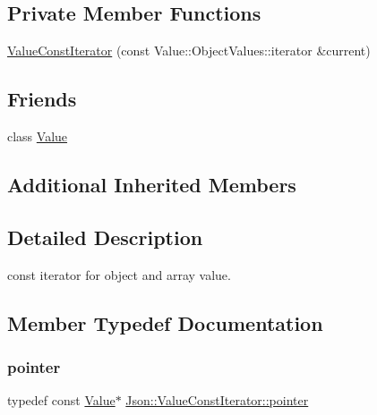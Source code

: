 \subsection*{Private Member Functions}
\begin{DoxyCompactItemize}
\item 
\hyperlink{classJson_1_1ValueConstIterator_aa0a87edf5f1097f91dca5f2a389c4abd_aa0a87edf5f1097f91dca5f2a389c4abd}{Value\+Const\+Iterator} (const Value\+::\+Object\+Values\+::iterator \&current)
\end{DoxyCompactItemize}
\subsection*{Friends}
\begin{DoxyCompactItemize}
\item 
class \hyperlink{classJson_1_1ValueConstIterator_aeceedf6e1a7d48a588516ce2b1983d6f_aeceedf6e1a7d48a588516ce2b1983d6f}{Value}
\end{DoxyCompactItemize}
\subsection*{Additional Inherited Members}


\subsection{Detailed Description}
const iterator for object and array value. 



\subsection{Member Typedef Documentation}
\mbox{\label{classJson_1_1ValueConstIterator_a400136bd8bc09e9fddec0785fa2cff14_a400136bd8bc09e9fddec0785fa2cff14}} 
\subsubsection{\texorpdfstring{pointer}{pointer}}
{\footnotesize\ttfamily typedef const \hyperlink{classJson_1_1Value}{Value}$\ast$ \hyperlink{classJson_1_1ValueConstIterator_a400136bd8bc09e9fddec0785fa2cff14_a400136bd8bc09e9fddec0785fa2cff14}{Json\+::\+Value\+Const\+Iterator\+::pointer}}

